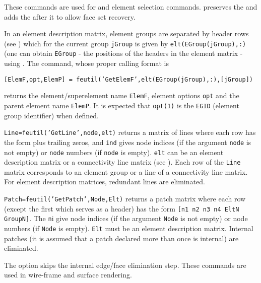 These commands are used for  and  element selection commands.  preserves the  and adds the  after it to allow face set recovery.


 In an element description matrix, element groups are separated by header rows (see ) which for the current group {\tt jGroup} is given by {\tt elt(EGroup(jGroup),:)} (one can obtain {\tt EGroup} - the positions of the headers in the element matrix - using . The  command, whose proper calling format is

\noindent 
{\tt [ElemF,opt,ElemP] = feutil('GetElemF',elt(EGroup(jGroup),:),[jGroup])}

\noindent returns the element/superelement name {\tt ElemF}, element options {\tt opt} and the parent element name {\tt ElemP}. It is expected that {\tt opt(1)} is the {\tt EGID} (element group identifier) when defined.


{\tt Line=feutil('GetLine',node,elt)} returns a matrix of lines where each row has the form plus trailing zeros, and {\tt ind}  gives node indices (if the argument {\tt node} is not empty) or {\tt node} numbers (if {\tt node} is empty). {\tt elt} can be an element description matrix or a connectivity line matrix (see \feplot).  Each row of the {\tt Line} matrix corresponds to an element group or a line of a connectivity line matrix. For element description matrices, redundant lines are eliminated.

{\tt Patch=feutil('GetPatch',Node,Elt)} returns a patch matrix where each row (except the first which serves as a header) has the form {\tt [n1 n2 n3 n4 EltN GroupN]}.  The {\tt n}{\ti i} give node indices (if the argument {\tt Node} is not empty) or node numbers (if {\tt Node} is empty).  {\tt Elt} must be an element description matrix.  Internal patches (it is assumed that a patch declared more than once is internal) are eliminated.

 The  option skips the internal edge/face elimination step. 
These commands are used in wire-frame and surface rendering.


